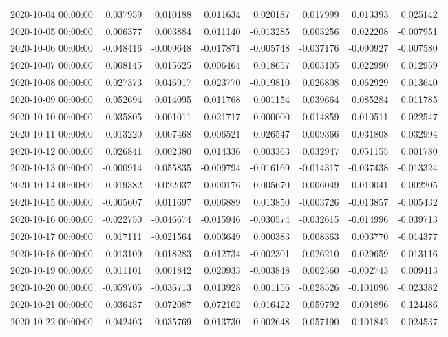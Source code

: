 \begin{tabular}{lrrrrrrr}
2020-10-04 00:00:00 & 0.037959 & 0.010188 & 0.011634 & 0.020187 & 0.017999 & 0.013393 & 0.025142 \\
2020-10-05 00:00:00 & 0.006377 & 0.003884 & 0.011140 & -0.013285 & 0.003256 & 0.022208 & -0.007951 \\
2020-10-06 00:00:00 & -0.048416 & -0.009648 & -0.017871 & -0.005748 & -0.037176 & -0.090927 & -0.007580 \\
2020-10-07 00:00:00 & 0.008145 & 0.015625 & 0.006464 & 0.018657 & 0.003105 & 0.022990 & 0.012959 \\
2020-10-08 00:00:00 & 0.027373 & 0.046917 & 0.023770 & -0.019810 & 0.026808 & 0.062929 & 0.013640 \\
2020-10-09 00:00:00 & 0.052694 & 0.014095 & 0.011768 & 0.001154 & 0.039664 & 0.085284 & 0.011785 \\
2020-10-10 00:00:00 & 0.035805 & 0.001011 & 0.021717 & 0.000000 & 0.014859 & 0.010511 & 0.022547 \\
2020-10-11 00:00:00 & 0.013220 & 0.007468 & 0.006521 & 0.026547 & 0.009366 & 0.031808 & 0.032994 \\
2020-10-12 00:00:00 & 0.026841 & 0.002380 & 0.014336 & 0.003363 & 0.032947 & 0.051155 & 0.001780 \\
2020-10-13 00:00:00 & -0.000914 & 0.055835 & -0.009794 & -0.016169 & -0.014317 & -0.037438 & -0.013324 \\
2020-10-14 00:00:00 & -0.019382 & 0.022037 & 0.000176 & 0.005670 & -0.006049 & -0.010041 & -0.002205 \\
2020-10-15 00:00:00 & -0.005607 & 0.011697 & 0.006889 & 0.013850 & -0.003726 & -0.013857 & -0.005432 \\
2020-10-16 00:00:00 & -0.022750 & -0.046674 & -0.015946 & -0.030574 & -0.032615 & -0.014996 & -0.039713 \\
2020-10-17 00:00:00 & 0.017111 & -0.021564 & 0.003649 & 0.000383 & 0.008363 & 0.003770 & -0.014377 \\
2020-10-18 00:00:00 & 0.013109 & 0.018283 & 0.012734 & -0.002301 & 0.026210 & 0.029659 & 0.013116 \\
2020-10-19 00:00:00 & 0.011101 & 0.001842 & 0.020933 & -0.003848 & 0.002560 & -0.002743 & 0.009413 \\
2020-10-20 00:00:00 & -0.059705 & -0.036713 & 0.013928 & 0.001156 & -0.028526 & -0.101096 & -0.023382 \\
2020-10-21 00:00:00 & 0.036437 & 0.072087 & 0.072102 & 0.016422 & 0.059792 & 0.091896 & 0.124486 \\
2020-10-22 00:00:00 & 0.042403 & 0.035769 & 0.013730 & 0.002648 & 0.057190 & 0.101842 & 0.024537 \\

\end{tabular}
